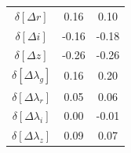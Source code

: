 \documentclass[a4paper,fleqn,usenatbib]{mnras}
\begin{document}
\begin{table}
\begin{tabular}{c|cc}
		$\delta [ \Delta r ]$ &    0.16 &      0.10     \\
		$\delta [ \Delta i ]$ &   -0.16 &     -0.18     \\
		$\delta [ \Delta z ]$ &   -0.26 &     -0.26     \\
		$\delta [ \Delta \lambda_g ]$ &    0.16 &      0.20     \\
		$\delta [ \Delta \lambda_r ]$ &    0.05 &      0.06     \\
		$\delta [ \Delta \lambda_i ]$ &    0.00 &     -0.01     \\
		$\delta [ \Delta \lambda_z ]$ &    0.09 &      0.07     \\
		\hline
	\end{tabular}
\end{table}

\end{document}
